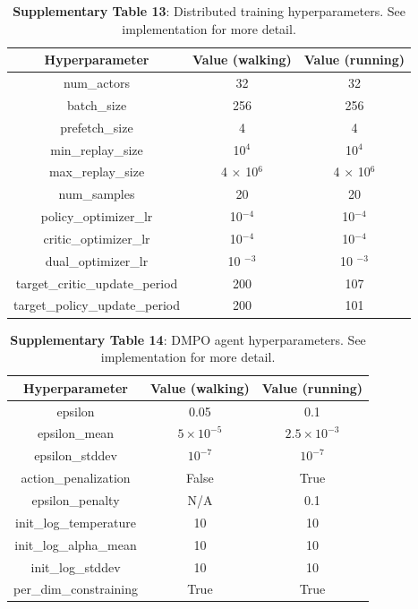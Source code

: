 \documentclass[sn-mathphys-num]{sn-jnl}%
\theoremstyle{thmstyleone}%
\theoremstyle{thmstyletwo}%
\theoremstyle{thmstylethree}%
\begin{document}
\begin{appendices}
\begin{table}[htbp]
	\centering
	\small
	\caption{\textbf{Supplementary Table 13}: 
		Distributed training hyperparameters. 
		See implementation for more detail.
	}
	\begin{tabular}{ccc}
		\toprule
		\textbf{Hyperparameter}        &        \textbf{Value (walking)}  & \textbf{Value (running)}   \\
		\midrule
		num\_actors     &  32     &  32 \\
		batch\_size     &  256     &  256 \\
		prefetch\_size     &  4     &  4 \\
		min\_replay\_size     &  10$ ^4 $     & 10$ ^4 $ \\
		max\_replay\_size     & 4 $ \times $ 10$ ^6 $     & 4 $ \times $ 10$ ^6 $  \\
		num\_samples     &   20    &  20 \\
		policy\_optimizer\_lr     &   10$ ^{-4} $    &  10$ ^{-4} $ \\
		critic\_optimizer\_lr     &   10$ ^{-4} $    &  10$ ^{-4} $ \\
		dual\_optimizer\_lr     &   10 $ ^{-3} $    &  10 $ ^{-3} $ \\
		target\_critic\_update\_period     &   200    &  107 \\
		target\_policy\_update\_period     &   200    &  101 \\
		\bottomrule
	\end{tabular}%
	\label{tab:s_13}%
\end{table}%



\begin{table}[htbp]
	\centering
	\small
	\caption{\textbf{Supplementary Table 14}: 
		DMPO agent hyperparameters. 
		See implementation for more detail.
	}
	\begin{tabular}{ccc}
		\toprule
		\textbf{Hyperparameter}        &        \textbf{Value (walking)}  & \textbf{Value (running)}   \\
		\midrule
		epsilon     &  0.05     &  0.1 \\
		epsilon\_mean     &  $ 5 \times 10^{-5} $     &  $ 2.5 \times 10 ^{-3} $ \\
		epsilon\_stddev     &  $ 10^{-7} $     &  $ 10^{-7} $ \\
		action\_penalization     &  False     &  True \\
		epsilon\_penalty     &  N/A     &  0.1 \\
		init\_log\_temperature     &  10     &  10 \\
		init\_log\_alpha\_mean     &  10     &  10 \\
		init\_log\_stddev     &  10     &  10 \\
		per\_dim\_constraining     &  True     &  True \\
		\bottomrule
	\end{tabular}%
	\label{tab:s_14}%
\end{table}%



\end{appendices}
\end{document}

